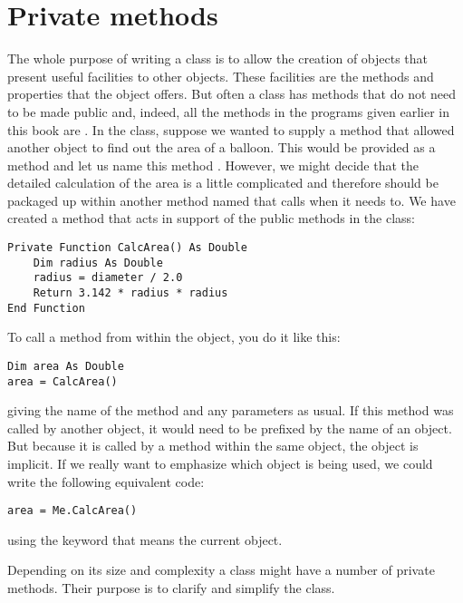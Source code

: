 	\section{Private methods}
	The whole purpose of writing a class is to allow the creation of objects that present useful facilities to other objects. These facilities are the  methods and properties that the object offers. But often a class has methods that do not need to be made public and, indeed, all the methods in the programs given earlier in this book are . In the  class, suppose we wanted to supply a method that allowed another object to find out the area of a balloon. This would be provided as a  method and let us name this method . However, we might decide that the detailed calculation of the area is a little complicated and therefore should be packaged up within another  method named  that  calls when it needs to. We have created a  method that acts in support of the public methods in the class:
		\begin{lstlisting}
Private Function CalcArea() As Double
	Dim radius As Double	
	radius = diameter / 2.0
	Return 3.142 * radius * radius
End Function
		\end{lstlisting}
		To call a method from within the object, you do it like this:
		\begin{lstlisting}
Dim area As Double
area = CalcArea()
		\end{lstlisting}
		giving the name of the method and any parameters as usual. If this method was called by another object, it would need to be prefixed by the name of an object. But because it is called by a method within the same object, the object is implicit. If we really want to emphasize which object is being used, we could write the following equivalent code:
		\begin{lstlisting}
area = Me.CalcArea()
		\end{lstlisting}
		using the keyword  that means the current object.
		
		Depending on its size and complexity a class might have a number of private methods. Their purpose is to clarify and simplify the class.


